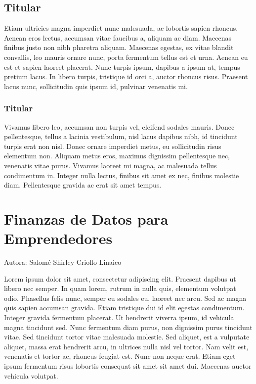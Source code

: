 \documentclass[
  letterpaper,
  DIV=11,
  numbers=noendperiod]{scrreprt}
\begin{document}
\hypertarget{titular-8}{%
\section{Titular}\label{titular-8}}

Etiam ultricies magna imperdiet nunc malesuada, ac lobortis sapien
rhoncus. Aenean eros lectus, accumsan vitae faucibus a, aliquam ac diam.
Maecenas finibus justo non nibh pharetra aliquam. Maecenas egestas, ex
vitae blandit convallis, leo mauris ornare nunc, porta fermentum tellus
est et urna. Aenean eu est et sapien laoreet placerat. Nunc turpis
ipsum, dapibus a ipsum at, tempus pretium lacus. In libero turpis,
tristique id orci a, auctor rhoncus risus. Praesent lacus nunc,
sollicitudin quis ipsum id, pulvinar venenatis mi.

\hypertarget{titular-9}{%
\subsection{Titular}\label{titular-9}}

Vivamus libero leo, accumsan non turpis vel, eleifend sodales mauris.
Donec pellentesque, tellus a lacinia vestibulum, nisl lacus dapibus
nibh, id tincidunt turpis erat non nisl. Donec ornare imperdiet metus,
eu sollicitudin risus elementum non. Aliquam metus eros, maximus
dignissim pellentesque nec, venenatis vitae purus. Vivamus laoreet mi
magna, ac malesuada tellus condimentum in. Integer nulla lectus, finibus
sit amet ex nec, finibus molestie diam. Pellentesque gravida ac erat sit
amet tempus.


\hypertarget{finanzas-de-datos-para-emprendedores}{%
\chapter{Finanzas de Datos para
Emprendedores}\label{finanzas-de-datos-para-emprendedores}}

Autora: Salomé Shirley Criollo Linaico

Lorem ipsum dolor sit amet, consectetur adipiscing elit. Praesent
dapibus ut libero nec semper. In quam lorem, rutrum in nulla quis,
elementum volutpat odio. Phasellus felis nunc, semper eu sodales eu,
laoreet nec arcu. Sed ac magna quis sapien accumsan gravida. Etiam
tristique dui id elit egestas condimentum. Integer gravida fermentum
placerat. Ut hendrerit viverra ipsum, id vehicula magna tincidunt sed.
Nunc fermentum diam purus, non dignissim purus tincidunt vitae. Sed
tincidunt tortor vitae malesuada molestie. Sed aliquet, est a vulputate
aliquet, massa erat hendrerit arcu, in ultrices nulla nisl vel tortor.
Nam velit est, venenatis et tortor ac, rhoncus feugiat est. Nunc non
neque erat. Etiam eget ipsum fermentum risus lobortis consequat sit amet
sit amet dui. Maecenas auctor vehicula volutpat.
\end{document}
